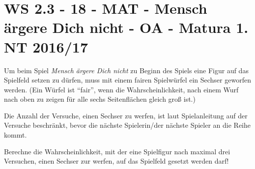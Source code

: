 \section{WS 2.3 - 18 - MAT - Mensch ärgere Dich nicht - OA - Matura 1. NT 2016/17}

\begin{beispiel}[WS 2.3]{1} %
Um beim Spiel \textit{Mensch ärgere Dich nicht} zu Beginn des Spiels eine Figur auf das Spielfeld setzen zu dürfen, muss mit einem fairen Spielwürfel ein Sechser geworfen werden. (Ein Würfel ist "`fair"', wenn die Wahrscheinlichkeit, nach einem Wurf nach oben zu zeigen für alle sechs Seitenflächen gleich groß ist.)

Die Anzahl der Versuche, einen Sechser zu werfen, ist laut Spielanleitung auf der Versuche beschränkt, bevor die nächste Spielerin/der nächste Spieler an die Reihe kommt.

Berechne die Wahrscheinlichkeit, mit der eine Spielfigur nach maximal drei Versuchen, einen Sechser zur werfen, auf das Spielfeld gesetzt werden darf!

\end{beispiel}